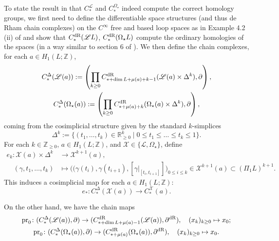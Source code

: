 \documentclass[10pt]{amsart}
\numberwithin{equation}{section}
\theoremstyle{plain}
\theoremstyle{definition}
\theoremstyle{remark}
\numberwithin{equation}{section}
\newcommand{\R}{\mathbb{R}}
\newcommand{\Z}{\mathbb{Z}}
\newcommand{\mc}[1]{\mathcal{#1}}
\newcommand{\ms}[1]{\mathscr{#1}}
\newcommand{\dR}{\textup{dR}}
\newcommand{\pr}{\textup{pr}}
\newcommand{\CFr}{C_*^\mathscr{L}}
\newcommand{\CBa}{C_*^{\Omega_\star}}
\begin{document}
{To state the result in \cite{WangThesis}  that $\CFr$ and $\CBa$ indeed compute the correct homology groups,
we first need to define the differentiable space structures (and thus de Rham chain complexes) on the $C^\infty$ free and based loop spaces as in Example 4.2 (ii) of \cite{Irie1} and show that $C^\dR_*(\mathscr{L} L)$, $C_*^\dR(\Omega_\star L)$ compute the ordinary homologies of the spaces (in a way similar to section 6 of \cite{Irie1}).
We then define the chain complexes, for each $a\in H_1(L;\Z)$,
\begin{gather*}
	C_*^\Delta(\ms{L}(a)):= \left( \prod_{k\geq 0} C^\dR_{*+\dim L + \mu(a) + k - 1}(\ms{L}(a)\times \Delta^k), \partial\right),\\
	C_*^\Delta (\Omega_\star(a)):= \left( \prod_{k\geq 0} C^\dR_{*+\mu(a)+k}(\Omega_\star (a)\times \Delta^k),\partial \right),
\end{gather*}
coming from the cosimplicial structure given by the standard $k$-simplices \[\Delta^k:= \{ (t_1,\dots, t_k)\in \R_{\geq 0}^{k}\mid 0\leq t_1\leq \dots \leq t_k \leq 1\} .\]
For each $k\in \Z_{\geq 0}$, $a\in H_1(L;\Z)$, and $\mc{X}\in \{\ms{L},\Omega_\star\}$, define
\begin{align*}
	e_k\colon \mathcal{X}(a)\times \Delta^k &\to \mathcal{X}^{k+1} (a),\\ \quad  (\gamma, t_1,\dots, t_k)&\mapsto \big((\gamma(t_i), \gamma(t_{i+1}), [\gamma|_{[t_i,t_{i+1}]}] \big)_{0\leq i \leq k} \in \mathcal{X}^{k+1} (a) \subset (\Pi_1 L)^{k+1}.
\end{align*}
This induces a cosimplicial map for each $a\in H_1(L;\Z)$:
\[
	e_*\colon C_*^\Delta(\mathcal{X}(a))\to C_*^\mathcal{X}(a).
\]

On the other hand, we have the chain maps
\begin{gather*}	
	\pr_0 \colon (C_*^\Delta(\ms{L}(a)), \partial)\to (C_{*+\dim L + \mu(a) - 1}^\dR(\ms{L} (a)),\partial^\dR) ,\quad (x_k)_{k\geq 0} \mapsto x_0; \\
	\pr_0 \colon (C_*^\Delta(\Omega_\star(a)), \partial)\to (C_{*+ \mu(a)}^\dR(\Omega_\star (a)),\partial^\dR) ,\quad (x_k)_{k\geq 0} \mapsto x_0.
\end{gather*}


}
\end{document}
